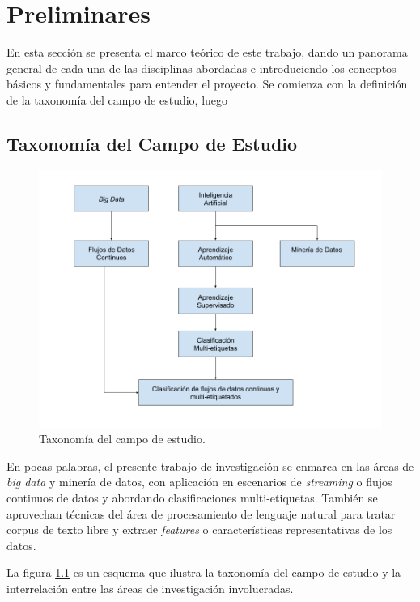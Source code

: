 \chapter{Preliminares}

En esta sección se presenta el marco teórico de este trabajo, dando un panorama
general de cada una de las disciplinas abordadas e introduciendo los conceptos
básicos y fundamentales para entender el proyecto. Se comienza con la definición
de la taxonomía del campo de estudio, luego 

\section{Taxonomía del Campo de Estudio}

\begin{figure}
   \includegraphics[width=.9\linewidth]{figures/study_field_taxonomy_v2.png}
   \centering
   \caption{Taxonomía del campo de estudio.}
   \label{fig:campo_estudio}
\end{figure}

En pocas palabras, el presente trabajo de investigación se enmarca en las áreas
de \textit{big data} y minería de datos, con aplicación en escenarios de
\textit{streaming} o flujos continuos de datos y abordando clasificaciones
multi-etiquetas. También se aprovechan técnicas del área de procesamiento de
lenguaje natural para tratar corpus de texto libre y extraer \textit{features} o
características representativas de los datos.

La figura \ref{fig:campo_estudio} es un esquema que ilustra la taxonomía del
campo de estudio y la interrelación entre las áreas de investigación
involucradas.

